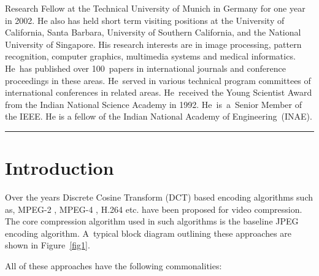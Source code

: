 \documentclass{doublecol-new}
\theoremstyle{TH}{
\newtheorem{lemma}{Lemma}[section]
\newtheorem{theorem}{Theorem}
\newtheorem{corrolary}{Corrolary}
\newtheorem{conjecture}[lemma]{Conjecture}
\newtheorem{proposition}[lemma]{Proposition}
\newtheorem{claim}[lemma]{Claim}
\newtheorem{stheorem}[lemma]{Wrong Theorem}
}
\theoremstyle{THrm}{
\newtheorem{definition}{Definition}[section]
\newtheorem{question}{Question}[section]
\newtheorem{remark}{Remark}[section]
\newtheorem{scheme}{Scheme}
}
\theoremstyle{THhit}{
\newtheorem{case}{Case}[section]
}
\begin{document}
\noindent\parbox{42.4pc}{\leftskip 12.75pc\NINE Research Fellow at
the Technical University of Munich in Germany for one year in 2002.
He also has held short term visiting positions at the University of
California, Santa Barbara, University of Southern California, and the
National University of Singapore. His research interests are in image
processing, pattern recognition, computer graphics, multimedia
systems and medical informatics. He~has published over 100~papers in
international journals and conference proceedings in these areas.
He~served in various technical program committees of international
conferences in related areas. He~received the Young Scientist Award
from the Indian National Science Academy in 1992. He~is~a~Senior
Member of the IEEE. He is a fellow of the Indian National Academy of
Engineering~(INAE).}

\noindent\rule{42.5pc}{1.5pt}

\maketitle

\section{Introduction}

Over the years Discrete Cosine Transform (DCT) based encoding algorithms such
as, MPEG-2 \citep{1,2}, MPEG-4 \citep{3}, H.264 \citep{4,5} etc.
 have been proposed for video compression.
The core compression algorithm used in such algorithms  is the baseline JPEG
\citep{6} encoding algorithm. A~typical block diagram outlining these approaches
are shown in Figure~\ref{fig1}.

\noindent
 All of these approaches have the following
commonalities:
\end{document}
